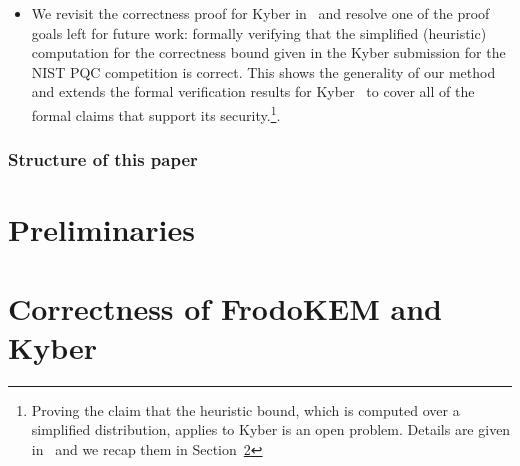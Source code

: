 \documentclass[conference,compsoc]{IEEEtran}
\begin{document}
\begin{itemize}[leftmargin=*]
  \item We revisit the correctness proof for Kyber in~\cite{} and resolve one of the proof goals left for future work: formally verifying that the simplified (heuristic) computation for the correctness bound given in the Kyber submission for the NIST PQC competition is correct. This shows the generality of our method and extends the formal verification results for Kyber~\cite{} to cover all of the formal claims that support its security.\footnote{Proving the claim that the heuristic bound, which is computed over a simplified distribution, applies to Kyber is an open problem. Details are given in~\cite{} and we recap them in Section~\ref{}}.
\end{itemize}

\subsubsection*{Structure of this paper}


\section{Preliminaries}

\section{Correctness of FrodoKEM and Kyber}
\end{document}
